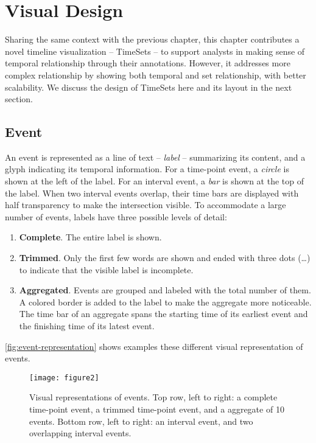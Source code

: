 \section{Visual Design}
Sharing the same context with the previous chapter, this chapter contributes a novel timeline visualization -- TimeSets -- to support analysts in making sense of temporal relationship through their annotations. However, it addresses more complex relationship by showing both temporal and set relationship, with better scalability. We discuss the design of TimeSets here and its layout in the next section.

\subsection{Event}
An event is represented as a line of text -- \emph{label} -- summarizing its content, and a glyph indicating its temporal information. For a time-point event, a \emph{circle} is shown at the left of the label. For an interval event, a \emph{bar} is shown at the top of the label. When two interval events overlap, their time bars are displayed with half transparency to make the intersection visible. To accommodate a large number of events, labels have three possible levels of detail:
\begin{enumerate}
	\item \textbf{Complete}. The entire label is shown.
	\item \textbf{Trimmed}. Only the first few words are shown and ended with three dots (\dots) to indicate that the visible label is incomplete.
	\item \textbf{Aggregated}. Events are grouped and labeled with the total number of them. A colored border is added to the label to make the aggregate more noticeable. The time bar of an aggregate spans the starting time of its earliest event and the finishing time of its latest event.
\end{enumerate}

\autoref{fig:event-representation} shows examples these different visual representation of events.

\begin{figure}[!htb]
\centering
\texttt{[image: figure2]}\caption{Visual representations of events. Top row, left to right: a complete time-point event, a trimmed time-point event, and a aggregate of 10 events. Bottom row, left to right: an interval event, and two overlapping interval events.}
\label{fig:event-representation}
\end{figure}

